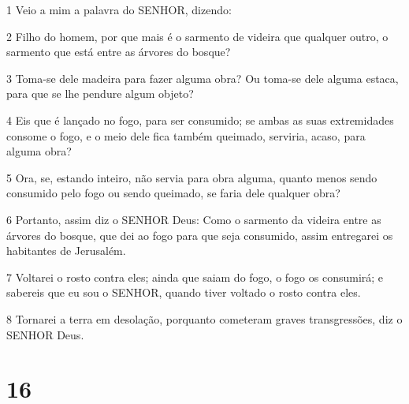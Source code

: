 \par 1 Veio a mim a palavra do SENHOR, dizendo:
\par 2 Filho do homem, por que mais é o sarmento de videira que qualquer outro, o sarmento que está entre as árvores do bosque?
\par 3 Toma-se dele madeira para fazer alguma obra? Ou toma-se dele alguma estaca, para que se lhe pendure algum objeto?
\par 4 Eis que é lançado no fogo, para ser consumido; se ambas as suas extremidades consome o fogo, e o meio dele fica também queimado, serviria, acaso, para alguma obra?
\par 5 Ora, se, estando inteiro, não servia para obra alguma, quanto menos sendo consumido pelo fogo ou sendo queimado, se faria dele qualquer obra?
\par 6 Portanto, assim diz o SENHOR Deus: Como o sarmento da videira entre as árvores do bosque, que dei ao fogo para que seja consumido, assim entregarei os habitantes de Jerusalém.
\par 7 Voltarei o rosto contra eles; ainda que saiam do fogo, o fogo os consumirá; e sabereis que eu sou o SENHOR, quando tiver voltado o rosto contra eles.
\par 8 Tornarei a terra em desolação, porquanto cometeram graves transgressões, diz o SENHOR Deus.

\chapter{16}

